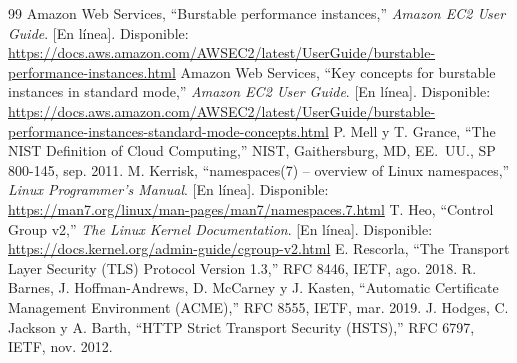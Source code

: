 \documentclass[conference,a4paper]{IEEEtran}
\begin{document}
\begin{thebibliography}{99}
 Amazon Web Services, ``Burstable performance instances,'' \textit{Amazon EC2 User Guide}. [En línea]. Disponible: \url{https://docs.aws.amazon.com/AWSEC2/latest/UserGuide/burstable-performance-instances.html}
 Amazon Web Services, ``Key concepts for burstable instances in standard mode,'' \textit{Amazon EC2 User Guide}. [En línea]. Disponible: \url{https://docs.aws.amazon.com/AWSEC2/latest/UserGuide/burstable-performance-instances-standard-mode-concepts.html}
 P. Mell y T. Grance, ``The NIST Definition of Cloud Computing,'' NIST, Gaithersburg, MD, EE.~UU., SP 800-145, sep. 2011.
 M. Kerrisk, ``namespaces(7) -- overview of Linux namespaces,'' \textit{Linux Programmer's Manual}. [En línea]. Disponible: \url{https://man7.org/linux/man-pages/man7/namespaces.7.html}
 T. Heo, ``Control Group v2,'' \textit{The Linux Kernel Documentation}. [En línea]. Disponible: \url{https://docs.kernel.org/admin-guide/cgroup-v2.html}
 E. Rescorla, ``The Transport Layer Security (TLS) Protocol Version 1.3,'' RFC 8446, IETF, ago. 2018.
 R. Barnes, J. Hoffman-Andrews, D. McCarney y J. Kasten, ``Automatic Certificate Management Environment (ACME),'' RFC 8555, IETF, mar. 2019.
 J. Hodges, C. Jackson y A. Barth, ``HTTP Strict Transport Security (HSTS),'' RFC 6797, IETF, nov. 2012.
\end{thebibliography}
\end{document}
